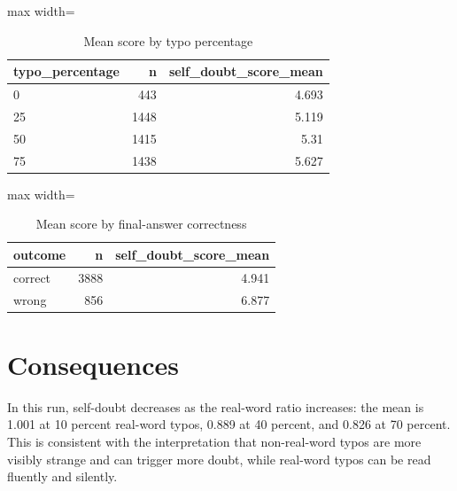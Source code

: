 \documentclass[11pt]{article}
\begin{document}
\begin{table}[H]
\centering
\caption{Mean score by typo percentage}
\small
\begin{adjustbox}{max width=\textwidth}
\begin{tabular}{lrr}
\toprule
\textbf{typo\_percentage} & \textbf{n} & \textbf{self\_doubt\_score\_mean} \\
\midrule
0 & 443 & 4.693 \\
25 & 1448 & 5.119 \\
50 & 1415 & 5.31 \\
75 & 1438 & 5.627 \\
\bottomrule
\end{tabular}
\end{adjustbox}
\end{table}

\begin{table}[H]
\centering
\caption{Mean score by final-answer correctness}
\small
\begin{adjustbox}{max width=\textwidth}
\begin{tabular}{lrr}
\toprule
\textbf{outcome} & \textbf{n} & \textbf{self\_doubt\_score\_mean} \\
\midrule
correct & 3888 & 4.941 \\
wrong & 856 & 6.877 \\
\bottomrule
\end{tabular}
\end{adjustbox}
\end{table}

\section*{Consequences} In this run, self-doubt decreases as the real-word ratio increases: the mean is 1.001 at 10 percent real-word typos, 0.889 at 40 percent, and 0.826 at 70 percent. This is consistent with the interpretation that non-real-word typos are more visibly strange and can trigger more doubt, while real-word typos can be read fluently and silently.
\end{document}

